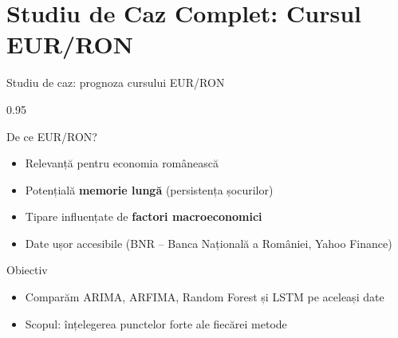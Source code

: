\documentclass[9pt, aspectratio=169, t]{beamer}
\begin{document}
\section{Studiu de Caz Complet: Cursul EUR/RON}

\begin{frame}{Studiu de caz: prognoza cursului EUR/RON}
    \begin{cminipage}{0.95\textwidth}
        \begin{block}{De ce EUR/RON?}
            \begin{itemize}\setlength{\itemsep}{0pt}
                \item Relevanță pentru economia românească
                \item Potențială \textbf{memorie lungă} (persistența șocurilor)
                \item Tipare influențate de \textbf{factori macroeconomici}
                \item Date ușor accesibile (BNR -- Banca Națională a României, Yahoo Finance)
            \end{itemize}
        \end{block}

        \vspace{0.2cm}

        \begin{exampleblock}{Obiectiv}
            \begin{itemize}\setlength{\itemsep}{0pt}
                \item Comparăm ARIMA, ARFIMA, Random Forest și LSTM pe aceleași date
                \item Scopul: înțelegerea punctelor forte ale fiecărei metode
            \end{itemize}
        \end{exampleblock}
    \end{cminipage}
\end{frame}
\end{document}
